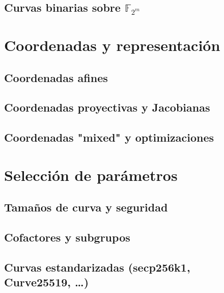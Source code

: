 \subsection{Curvas binarias sobre \texorpdfstring{$\mathbb{F}_{2^m}$}{F2m}}

\section{Coordenadas y representación}
\subsection{Coordenadas afines}
\subsection{Coordenadas proyectivas y Jacobianas}
\subsection{Coordenadas "mixed" y optimizaciones}

\section{Selección de parámetros}
\subsection{Tamaños de curva y seguridad}
\subsection{Cofactores y subgrupos}
\subsection{Curvas estandarizadas (secp256k1, Curve25519, …)}